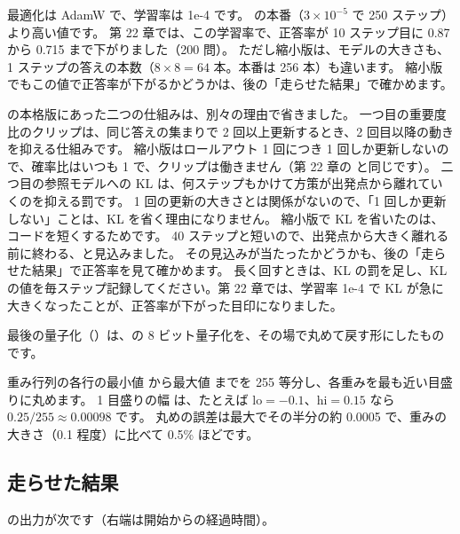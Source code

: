 最適化は AdamW で、学習率は 1e-4 です。
の本番（$3\times10^{-5}$ で 250 ステップ）より高い値です。
第 22 章では、この学習率で、正答率が 10 ステップ目に 0.87 から 0.715 まで下がりました（200 問）。
ただし縮小版は、モデルの大きさも、1 ステップの答えの本数（$8\times8=64$ 本。本番は 256 本）も違います。
縮小版でもこの値で正答率が下がるかどうかは、後の「走らせた結果」で確かめます。

の本格版にあった二つの仕組みは、別々の理由で省きました。
一つ目の重要度比のクリップは、同じ答えの集まりで 2 回以上更新するとき、2 回目以降の動きを抑える仕組みです。
縮小版はロールアウト 1 回につき 1 回しか更新しないので、確率比はいつも 1 で、クリップは働きません（第 22 章の  と同じです）。
二つ目の参照モデルへの KL は、何ステップもかけて方策が出発点から離れていくのを抑える罰です。
1 回の更新の大きさとは関係がないので、「1 回しか更新しない」ことは、KL を省く理由になりません。
縮小版で KL を省いたのは、コードを短くするためです。
40 ステップと短いので、出発点から大きく離れる前に終わる、と見込みました。
その見込みが当たったかどうかも、後の「走らせた結果」で正答率を見て確かめます。
長く回すときは、KL の罰を足し、KL の値を毎ステップ記録してください。第 22 章では、学習率 1e-4 で KL が急に大きくなったことが、正答率が下がった目印になりました。

最後の量子化（）は、の 8 ビット量子化を、その場で丸めて戻す形にしたものです。


重み行列の各行の最小値  から最大値  までを 255 等分し、各重みを最も近い目盛りに丸めます。
1 目盛りの幅  は、たとえば $\text{lo}=-0.1$、$\text{hi}=0.15$ なら $0.25/255\approx 0.00098$ です。
丸めの誤差は最大でその半分の約 0.0005 で、重みの大きさ（0.1 程度）に比べて 0.5\% ほどです。

\subsection*{走らせた結果}

 の出力が次です（右端は開始からの経過時間）。


